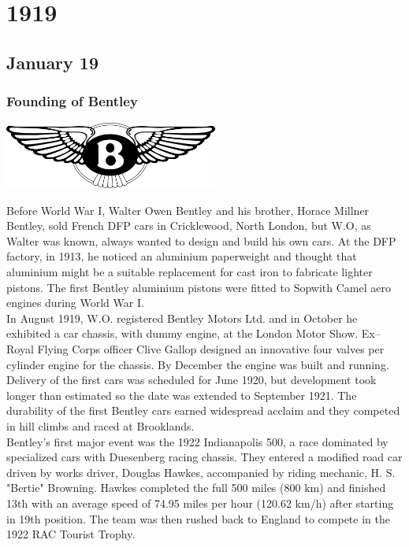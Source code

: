 \documentclass[11pt]{report}
\begin{document}
\chapter{1919}
\section{January 19}
\subsection{Founding of Bentley}
\vspace{2mm}\begin{center}\includegraphics[width=7cm]{./img/bentleyLogo.jpg}\end{center}
Before World War I, Walter Owen Bentley and his brother, Horace Millner Bentley, sold French DFP cars in Cricklewood, North London, but W.O, as Walter was known, always wanted to design and build his own cars. At the DFP factory, in 1913, he noticed an aluminium paperweight and thought that aluminium might be a suitable replacement for cast iron to fabricate lighter pistons. The first Bentley aluminium pistons were fitted to Sopwith Camel aero engines during World War I.\\
In August 1919, W.O. registered Bentley Motors Ltd. and in October he exhibited a car chassis, with dummy engine, at the London Motor Show. Ex–Royal Flying Corps officer Clive Gallop designed an innovative four valves per cylinder engine for the chassis. By December the engine was built and running. Delivery of the first cars was scheduled for June 1920, but development took longer than estimated so the date was extended to September 1921. The durability of the first Bentley cars earned widespread acclaim and they competed in hill climbs and raced at Brooklands.\\
Bentley's first major event was the 1922 Indianapolis 500, a race dominated by specialized cars with Duesenberg racing chassis. They entered a modified road car driven by works driver, Douglas Hawkes, accompanied by riding mechanic, H. S. "Bertie" Browning. Hawkes completed the full 500 miles (800 km) and finished 13th with an average speed of 74.95 miles per hour (120.62 km/h) after starting in 19th position. The team was then rushed back to England to compete in the 1922 RAC Tourist Trophy.
\end{document}
